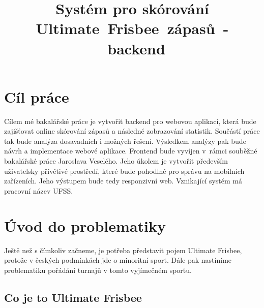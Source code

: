 \documentclass[thesis=B,czech]{FITthesis}[2012/06/26]
\title{Systém pro skórování Ultimate~Frisbee~zápasů~-~backend}
\begin{document}


\begin{introduction}
\end{introduction}

\chapter{Cíl práce}

Cílem mé bakalářské práce je vytvořit backend pro webovou aplikaci, která bude zajišťovat online
skórování zápasů a následné zobrazování statistik. Sou\-částí práce tak bude analýza dosavadních
i možných řešení. Výsledkem analýzy pak bude návrh a implementace webové aplikace. Frontend bude
vyvíjen v~rámci souběžné bakalářské práce Jaroslava Veselého. Jeho úkolem je vytvořit především
uživatelsky přívětivé prostředí, které bude pohodlné pro správu na mobilních zařízeních. Jeho
výstupem bude tedy responzivní web. Vznikající systém má pracovní název UFSS.

%
%

\chapter{Úvod do problematiky}

\indent

Ještě než s čímkoliv začneme, je potřeba představit pojem Ultimate Frisbee, protože v českých podmínkách jde o minoritní sport.
Dále pak nastíníme problematiku pořádání turnajů v tomto vyjímečném sportu.

\section{Co je to Ultimate Frisbee}
\end{document}

